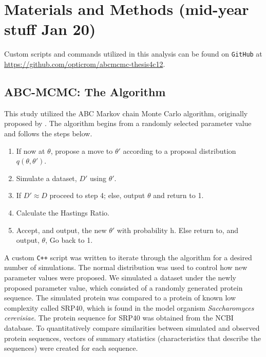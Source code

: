 \documentclass[10pt]{article}
\newcommand{\sclong}{\textit{Saccharomyces cerevisiae}\xspace}
\begin{document}

\section{Materials and Methods (mid-year stuff Jan 20)} 
\label{methods}
Custom scripts and commands utilized in this analysis can be found on \texttt{GitHub} at
\url{https://github.com/opticrom/abcmcmc-thesis4c12}.


\subsection{ABC-MCMC: The Algorithm}

This study utilized the ABC Markov chain Monte Carlo algorithm, originally proposed by \citet{marjoram2003markov}. The algorithm begins from a randomly selected parameter value and follows the steps below.

	\begin{enumerate}
		\item If now at $\theta$, propose a move to $\theta'$ according to a proposal distribution $q(\theta, \theta')$.
		\item Simulate a dataset, $D'$ using $\theta'$.
		\item If $D' \approx D$ proceed to step 4; else, output $\theta$ and return to 1.
		\item Calculate the Hastings Ratio.
		\item Accept, and output, the new $\theta'$ with probability h. Else return to, and output, $\theta$, Go back to 1.
	\end{enumerate}

A custom \texttt{C++} script was written to iterate through the algorithm for a desired number of simulations. The normal distribution was used to control how new parameter values were proposed. We simulated a dataset under the newly proposed parameter value, which consisted of a randomly generated protein sequence. The simulated protein was compared to a protein of known low complexity called SRP40, which is found in the model organism \sclong. The protein sequence for SRP40 was obtained from the NCBI database. To quantitatively compare similarities between simulated and observed protein sequences, vectors of summary statistics (characteristics that describe the sequences) were created for each sequence. 
\end{document}
